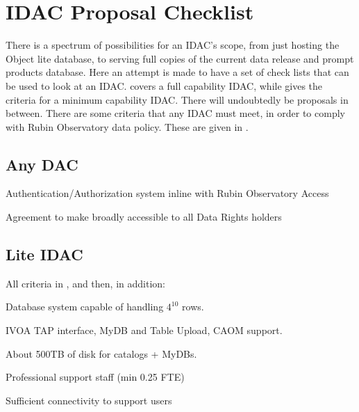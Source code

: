 
\section{IDAC Proposal Checklist}\label{sec:checklist}

There is a spectrum of possibilities for an \gls{IDAC}'s scope, from just hosting the \gls{Object} lite database, to serving full copies of the current data release and prompt products database.
Here an attempt is made to have a set of check lists  that can be used to look at an \gls{IDAC}.
 covers a full capability \gls{IDAC}, while   gives the criteria for a minimum capability \gls{IDAC}.
There will undoubtedly be proposals in between. There are some criteria that any \gls{IDAC} must meet, in order to comply with Rubin Observatory data policy. These are given in .

\subsection{Any \gls{DAC}} \label{sec:anyDAC}
\begin{todolist}
\item Authentication/Authorization system  inline with Rubin Observatory Access
\item Agreement to make broadly accessible to all Data Rights holders
\end{todolist}

\subsection{Lite \gls{IDAC}} \label{sec:liteDAC}
All criteria in , and then, in addition:
\begin{todolist}
\item Database system capable of handling $4^{10}$ rows.
\item \gls{IVOA} \gls{TAP} interface, MyDB and Table Upload, \gls{CAOM} support.
\item About 500TB of disk for catalogs + MyDBs.
\item Professional support staff (min 0.25 \gls{FTE})
\item Sufficient connectivity to support users
\end{todolist}


